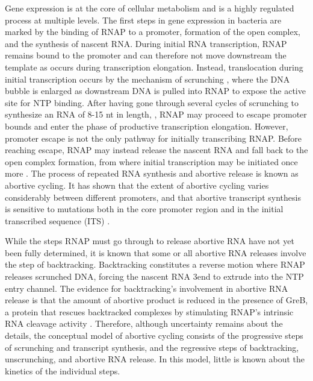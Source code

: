 %
Gene expression is at the core of cellular metabolism and is a highly regulated
process at multiple levels. The first steps in gene expression in bacteria are
marked by the binding of RNAP to a promoter, formation of the open complex,
and the synthesis of nascent RNA. During initial RNA transcription, RNAP
remains bound to the promoter and can therefore not move downstream the template as
occurs during transcription elongation. Instead, translocation during
initial transcription occurs by the mechanism of scrunching
\cite{revyakin_abortive_2006, kapanidis_initial_2006}, where the DNA bubble is
enlarged as downstream DNA is pulled into RNAP to expose the active site for
NTP binding. After having gone through several cycles of scrunching to
synthesize an RNA of 8-15 nt in length,
\cite{carpousis_cycling_1980,hsu_vitro_2003,tang_real-time_2009,hsu_initial_2006},
RNAP may proceed to escape promoter bounds and enter the phase of productive
transcription elongation. However, promoter escape is not the only pathway for
initially transcribing RNAP. Before reaching escape, RNAP may instead release
the nascent RNA and fall back to the open complex formation, from where
initial transcription may be initiated once more
\cite{carpousis_cycling_1980}. The process of repeated RNA synthesis and
abortive release is known as abortive cycling. It has shown that the extent of
abortive cycling varies considerably between different promoters, and that
abortive transcript synthesis is sensitive to mutations both in the core
promoter region and in the initial transcribed sequence (ITS)
\cite{hsu_initial_2006, hsu_promoter_2002, vo_vitro_2003}.

While the steps RNAP must go through to release abortive RNA have not yet been fully
determined, it is known that some or all abortive RNA releases involve the
step of backtracking. Backtracking constitutes a reverse motion where RNAP
releases scrunched DNA, forcing the nascent RNA 3\ppp end to extrude into the
NTP entry channel. The evidence for backtracking's involvement in abortive RNA
release is that the amount of abortive product is reduced in the presence of
GreB, a protein that rescues backtracked complexes by stimulating RNAP's
intrinsic RNA cleavage activity
\cite{hsu_escherichia_1995,feng_grea-induced_1994,hsu_initial_2006}.
Therefore, although uncertainty remains about the details, the conceptual
model of abortive cycling consists of the progressive steps of scrunching and
transcript synthesis, and the regressive steps of backtracking, unscrunching,
and abortive RNA release. In this model, little is known about the kinetics of
the individual steps.

